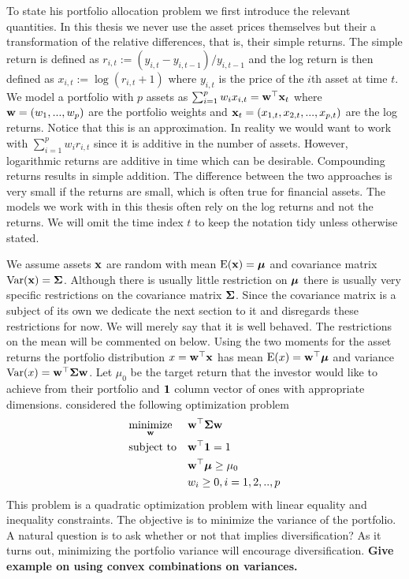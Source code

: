 \documentclass[]{book}
\begin{document}
To state his portfolio allocation problem we first introduce the relevant quantities. In this thesis we never use the asset prices themselves but their a transformation of the relative differences, that is, their simple returns. The simple return is defined as $r_{i,t} := (y_{i,t}-y_{i,t-1})/y_{i,t-1}$ and the log return is then defined as
$
x_{i,t} := \log(r_{i,t} + 1)
$
where $y_{i,t}$ is the price of the $i$th asset at time $t$. We model a portfolio with $p$ assets as $\sum_{i=1}^p w_i x_{i,t} = \mathbf{w}^\top \mathbf{x}_t$ where $\mathbf{w}=(w_1, ..., w_p)$ are the portfolio weights and $\mathbf{x}_t=(x_{1,t},x_{2,t},..., x_{p,t})$ are the log returns. Notice that this is an approximation. In reality we would want to work with $\sum_{i=1}^p w_i r_{i,t}$ since it is additive in the number of assets. However, logarithmic returns are additive in time which can be desirable. Compounding returns results in simple addition. The difference between the two approaches is very small if the returns are small, which is often true for financial assets. The models we work with in this thesis often rely on the log returns and not the returns. We will omit the time index $t$ to keep the notation tidy unless otherwise stated. 

We assume assets $\mathbf{x}$ are random with mean $\operatorname{E}(\mathbf{x})=\mbox{\boldmath$\mu$}$ and covariance matrix $\operatorname{Var}(\mathbf{x})=\mathbf{\Sigma}$. Although there is usually little restriction on $\mbox{\boldmath$\mu$}$ there is usually very specific restrictions on the covariance matrix $\mathbf{\Sigma}$. Since the covariance matrix is a subject of its own we dedicate the next section to it and disregards these restrictions for now. We will merely say that it is well behaved. The restrictions on the mean will be commented on below. Using the two moments for the asset returns the portfolio distribution $x = \mathbf{w}^\top \mathbf{x}$ has mean $\operatorname{E}(x)=\mathbf{w}^\top \mbox{\boldmath$\mu$}$ and variance $\operatorname{Var}(x)=\mathbf{w}^\top \mathbf{\Sigma} \mathbf{w}$. Let $\mu_0$ be the target return that the investor would like to achieve from their portfolio and $\mathbf{1}$ column vector of ones with appropriate dimensions. \citet{markowitz1959portfolio} considered the following optimization problem
\begin{equation}\label{eqn:markowitz_optim}
\begin{aligned}
& \underset{\mathbf{w}}{\text{minimize}} 
& & \mathbf{w}^\top \mathbf{\Sigma} \mathbf{w} \\
& \text{subject to}
& & \mathbf{w}^\top \mathbf{1} = 1 \\
& && \mathbf{w}^\top \mbox{\boldmath$\mu$} \geq \mu_0 \\
&&& w_i \geq 0, i=1,2,..,p
\end{aligned}
\end{equation}
This problem is a quadratic optimization problem with linear equality and inequality constraints. 
The objective is to minimize the variance of the portfolio. 
A natural question is to ask whether or not that implies diversification? As it turns out, minimizing the portfolio variance will encourage diversification.
\textbf{Give example on using convex combinations on variances.} 
 
\end{document}
